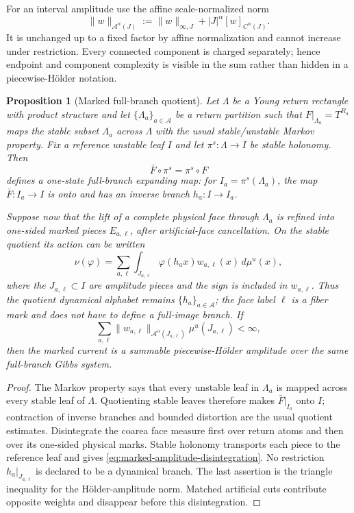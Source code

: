 \documentclass[11pt]{article}
\newtheorem{proposition}[theorem]{Proposition}
\begin{document}
For an interval amplitude use the affine scale-normalized norm
\begin{equation}
\label{eq:scaled-amplitude-norm}
 \|w\|_{\mathcal A^\alpha(J)}
 :=\|w\|_{\infty,J}+|J|^\alpha[w]_{C^\alpha(J)}.
\end{equation}
It is unchanged up to a fixed factor by affine normalization and cannot
increase under restriction.  Every connected component is charged
separately; hence endpoint and component complexity is visible in the sum
rather than hidden in a piecewise-H\"older notation.

\begin{proposition}[Marked full-branch quotient]
\label{prop:marked-full-branch-quotient}
Let $\Lambda$ be a Young return rectangle with product structure and let
$\{\Lambda_a\}_{a\in\mathcal A}$ be a return partition such that
$F|_{\Lambda_a}=T^{R_a}$ maps the stable subset $\Lambda_a$ across $\Lambda$
with the usual stable/unstable Markov property.  Fix a reference unstable
leaf $I$ and let $\pi^s:\Lambda\to I$ be stable holonomy.  Then
\[
 \bar F\circ\pi^s=\pi^s\circ F
\]
defines a one-state full-branch expanding map: for
$I_a=\pi^s(\Lambda_a)$, the map $\bar F:I_a\to I$ is onto and has an inverse
branch $h_a:I\to I_a$.

Suppose now that the lift of a complete physical face through $\Lambda_a$ is
refined into one-sided marked pieces $E_{a,\ell}$, after artificial-face
cancellation.  On the stable quotient its action can be written
\begin{equation}
\label{eq:marked-amplitude-disintegration}
 \nu(\varphi)=
 \sum_{a,\ell}\int_{J_{a,\ell}}
     \varphi(h_a x)w_{a,\ell}(x)\,d\mu^u(x),
\end{equation}
where the $J_{a,\ell}\subset I$ are amplitude pieces and the sign is included
in $w_{a,\ell}$.  Thus the quotient dynamical alphabet remains
$\{h_a\}_{a\in\mathcal A}$; the face label $\ell$ is a fiber mark and does
not have to define a full-image branch.  If
\[
 \sum_{a,\ell}\|w_{a,\ell}\|_{\mathcal A^\alpha(J_{a,\ell})}
      \mu^u(J_{a,\ell})<\infty,
\]
then the marked current is a summable piecewise-H\"older amplitude over the
same full-branch Gibbs system.
\end{proposition}

\begin{proof}
The Markov property says that every unstable leaf in $\Lambda_a$ is mapped
across every stable leaf of $\Lambda$.  Quotienting stable leaves therefore
makes $\bar F|_{I_a}$ onto $I$; contraction of inverse branches and bounded
distortion are the usual quotient estimates.  Disintegrate the coarea face
measure first over return atoms and then over its one-sided physical marks.
Stable holonomy transports each piece to the reference leaf and gives
\eqref{eq:marked-amplitude-disintegration}.  No restriction
$h_a|_{J_{a,\ell}}$ is declared to be a dynamical branch.  The last assertion
is the triangle inequality for the H\"older-amplitude norm.  Matched
artificial cuts contribute opposite weights and disappear before this
disintegration.
\end{proof}
\end{document}
